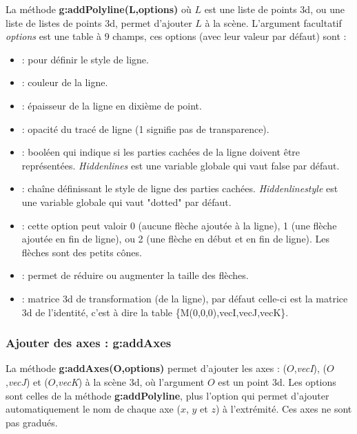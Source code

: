 La méthode \textbf{g:addPolyline(L,options)} où $L$ est une liste de points 3d, ou une liste de listes de points 3d, permet d'ajouter $L$ à la scène. L'argument facultatif \emph{options} est une table à 9 champs, ces options (avec leur valeur par défaut) sont :
    \begin{itemize}
        \item {} : pour définir le style de ligne.
        \item {} : couleur de la ligne.
        \item {} : épaisseur de la ligne en dixième de point.
        \item {} : opacité du tracé de ligne (1 signifie pas de transparence).
        \item {} : booléen qui indique si les parties cachées de la ligne doivent être représentées. \emph{Hiddenlines} est une variable globale qui vaut false par défaut.
        \item {} : chaîne définissant le style de ligne des parties cachées. \emph{Hiddenlinestyle} est une variable globale qui vaut "dotted" par défaut.
        \item {} : cette option peut valoir 0 (aucune flèche ajoutée à la ligne), 1 (une flèche ajoutée en fin de ligne), ou 2 (une flèche en début et en fin de ligne). Les flèches sont des petits cônes.
        \item {} : permet de réduire ou augmenter la taille des flèches.
        \item {} : matrice 3d de transformation (de la ligne), par défaut celle-ci est la matrice 3d de l'identité, c'est à dire la table \{M(0,0,0),vecI,vecJ,vecK\}.
    \end{itemize}
    
\subsubsection{Ajouter des axes : g:addAxes}

La méthode \textbf{g:addAxes(O,options)} permet d'ajouter les axes : ($O$,\emph{vecI}), ($O$,\emph{vecJ}) et ($O$,\emph{vecK}) à la scène 3d, où l'argument $O$ est un point 3d. Les options sont celles de la méthode \textbf{g:addPolyline}, plus l'option  qui permet d'ajouter automatiquement le nom de chaque axe ($x$, $y$ et $z$) à l'extrémité. Ces axes ne sont pas gradués.
    

